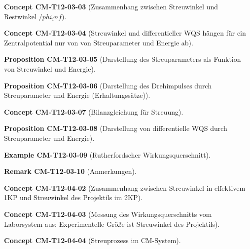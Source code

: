 \documentclass[10pt, letterpaper]{article}
\newcommand{\CustomHeading}[3]{%
  \par\medskip\noindent%
  \textbf{#1 #2} \textnormal{(#3)}.\enskip%
}
\newenvironment{PROP}[2]{\CustomHeading{Proposition}{#1}{#2}}{}
\newenvironment{REM}[2]{\CustomHeading{Remark}{#1}{#2}}{}
\newenvironment{EXA}[2]{\CustomHeading{Example}{#1}{#2}}{}
\newenvironment{CONC}[2]{\CustomHeading{Concept}{#1}{#2}}{}
\begin{document}
\begin{CONC}{CM-T12-03-03}{Zusammenhang zwischen Streuwinkel und Restwinkel $/phi_inf$}
\end{CONC}

\begin{CONC}{CM-T12-03-04}{Streuwinkel und differentieller WQS hängen für ein Zentralpotential nur von von Streuparameter und Energie ab}
\end{CONC}

\begin{PROP}{CM-T12-03-05}{Darstellung des Streuparameters als Funktion von Streuwinkel und Energie}
\end{PROP}

\begin{PROP}{CM-T12-03-06}{Darstellung des Drehimpulses durch Streuparameter und Energie (Erhaltungssätze)}
\end{PROP}

\begin{CONC}{CM-T12-03-07}{Bilanzgleichung für Streuung}
\end{CONC}

\begin{PROP}{CM-T12-03-08}{Darstellung von differentielle WQS durch Streuparameter und Energie}
\end{PROP}

\begin{EXA}{CM-T12-03-09}{Rutherfordscher Wirkungsquerschnitt}
\end{EXA}

\begin{REM}{CM-T12-03-10}{Anmerkungen}
\end{REM}

\begin{CONC}{CM-T12-04-02}{Zusammenhang zwischen Streuwinkel in effektivem 1KP und Streuwinkel des Projektils im 2KP}
\end{CONC}

\begin{CONC}{CM-T12-04-03}{Messung des Wirkungsquerschnitts vom Laborsystem aus: Experimentelle Größe ist Streuwinkel des Projektils}
\end{CONC}

\begin{CONC}{CM-T12-04-04}{Streuprozess im CM-System}
\end{CONC}
\end{document}
